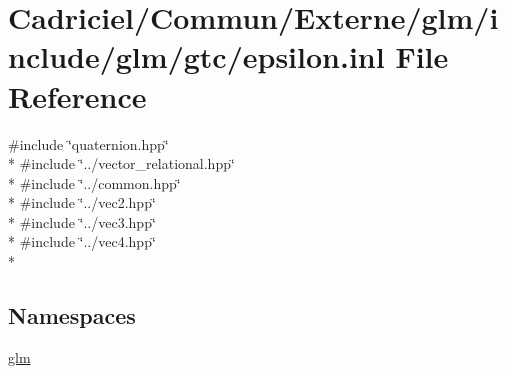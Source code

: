 \hypertarget{epsilon_8inl}{}\section{Cadriciel/\+Commun/\+Externe/glm/include/glm/gtc/epsilon.inl File Reference}
\label{epsilon_8inl}
{\ttfamily \#include \char`\"{}quaternion.\+hpp\char`\"{}}\\*
{\ttfamily \#include \char`\"{}../vector\+\_\+relational.\+hpp\char`\"{}}\\*
{\ttfamily \#include \char`\"{}../common.\+hpp\char`\"{}}\\*
{\ttfamily \#include \char`\"{}../vec2.\+hpp\char`\"{}}\\*
{\ttfamily \#include \char`\"{}../vec3.\+hpp\char`\"{}}\\*
{\ttfamily \#include \char`\"{}../vec4.\+hpp\char`\"{}}\\*
\subsection*{Namespaces}
\begin{DoxyCompactItemize}
\item 
 \hyperlink{namespaceglm}{glm}
\end{DoxyCompactItemize}
